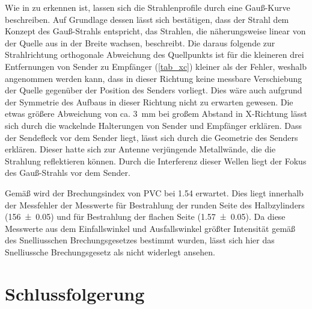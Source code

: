 \documentclass[
	a4paper,
	12pt,
	pagesize,
	ngerman
]{scrartcl}
\begin{document}
	Wie in  zu erkennen ist, lassen sich die Strahlenprofile durch eine Gauß-Kurve beschreiben.
	Auf Grundlage dessen lässt sich bestätigen, dass der Strahl dem Konzept des Gauß-Strahls entspricht, das Strahlen, die näherungsweise linear von der Quelle aus in der Breite wachsen, beschreibt.
	Die daraus folgende zur Strahlrichtung orthogonale Abweichung des Quellpunkts ist für die kleineren drei Entfernungen von Sender zu Empfänger (\cref{tab_xc}) kleiner als der Fehler, weshalb angenommen werden kann, dass in dieser Richtung keine messbare Verschiebung der Quelle gegenüber der Position des Senders vorliegt.
	Dies wäre auch aufgrund der Symmetrie des Aufbaus in dieser Richtung nicht zu erwarten gewesen.
	Die etwas größere Abweichung von ca. \SI{3}{mm} bei großem Abstand in X-Richtung lässt sich durch die wackelnde Halterungen von Sender und Empfänger erklären.
	Dass der Sendefleck vor dem Sender liegt, lässt sich durch die Geometrie des Senders erklären.
	Dieser hatte sich zur Antenne verjüngende Metallwände, die die Strahlung reflektieren können.
	Durch die Interferenz dieser Wellen liegt der Fokus des Gauß-Strahls vor dem Sender.
	
	Gemäß \cite{PVC-Brech} wird der Brechungsindex von PVC bei \SI{1,54}{} erwartet.
	Dies liegt innerhalb der Messfehler der Messwerte für Bestrahlung der runden Seite des Halbzylinders (\SI{156\pm 0,05}{}) und für Bestrahlung der flachen Seite (\SI{1,57 \pm 0,05}{}).
	Da diese Messwerte aus dem Einfallswinkel und Ausfallswinkel größter Intensität gemäß des Snelliusschen Brechungsgesetzes bestimmt wurden, lässt sich hier das Snelliussche Brechungsgesetz als nicht widerlegt ansehen. %
	
	 
	
	
	\section{Schlussfolgerung}
	
\end{document}
